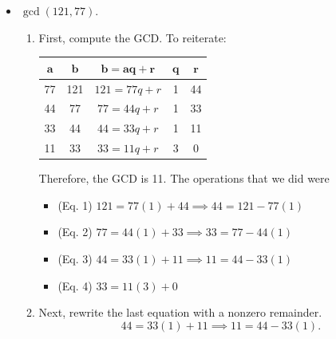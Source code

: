 \documentclass[letterpaper]{article}
\begin{document}
\begin{mdframed}
\begin{itemize}
\begin{mdframed}
        \end{mdframed}
        \item $\gcd(121, 77).$
        \begin{mdframed}
            \begin{enumerate}
                \item First, compute the GCD. To reiterate:
                \begin{center}
                    \begin{tabular}{|c|c|c|c|c|}
                        \hline 
                        $\mathbf{a}$ & $\mathbf{b}$ & $\mathbf{b = aq + r}$ & $\mathbf{q}$ & $\mathbf{r}$ \\ 
                        \hline 
                        77 & 121 & $121 = 77q + r$ & 1 & 44 \\ 
                        44 & 77 & $77 = 44q + r$ & 1 & 33 \\ 
                        33 & 44 & $44 = 33q + r$ & 1 & 11 \\ 
                        11 & 33 & $33 = 11q + r$ & 3 & 0 \\ 
                        \hline 
                    \end{tabular}
                \end{center}
                Therefore, the GCD is 11. The operations that we did were 
                \begin{itemize}
                    \item (Eq. 1) $121 = 77(1) + 44 \implies 44 = 121 - 77(1)$ 
                    \item (Eq. 2) $77 = 44(1) + 33 \implies 33 = 77 - 44(1)$
                    \item (Eq. 3) $44 = 33(1) + 11 \implies 11 = 44 - 33(1)$
                    \item (Eq. 4) $33 = 11(3) + 0$
                \end{itemize}

                \item Next, rewrite the last equation with a nonzero remainder.
                \[44 = 33(1) + 11 \implies 11 = 44 - 33(1).\]


\end{enumerate}
\end{mdframed}
\end{itemize}
\end{mdframed}
\end{document}
